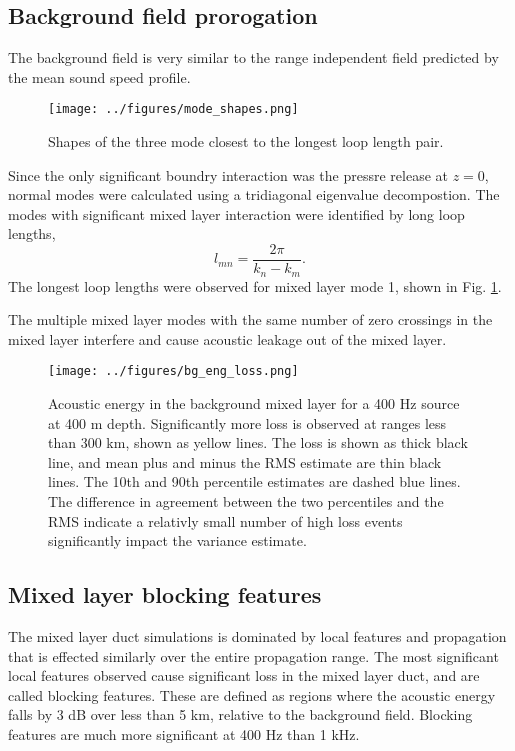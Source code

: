 \documentclass[preprint,NumberedRefs]{JASA}
\begin{document}
\subsection{Background field prorogation}
The background field is very similar to the range independent field predicted by the mean sound speed profile.
\begin{figure}
\texttt{[image: ../figures/mode\_shapes.png]}
    \caption{\label{fig:bg_modes}{Shapes of the three mode closest to the longest loop length pair.}}
\end{figure}

Since the only significant boundry interaction was the pressre release at $z=0$, normal modes were calculated using a tridiagonal eigenvalue decompostion. The modes with significant mixed layer interaction were identified by long loop lengths,
\begin{equation}
    l_{mn} = \frac{2 \pi}{k_n - k_m}.
    \label{eq:loop_length}
\end{equation}
The longest loop lengths were observed for mixed layer mode 1, shown in Fig. \ref{fig:bg_modes}.

The multiple mixed layer modes with the same number of zero crossings in the mixed layer interfere and cause acoustic leakage out of the mixed layer.
\begin{figure}
\texttt{[image: ../figures/bg\_eng\_loss.png]}
    \caption{Acoustic energy in the background mixed layer for a 400 Hz source at 400 m depth. Significantly more loss is observed at ranges less than 300 km, shown as yellow lines. The loss is shown as thick black line, and mean plus and minus the RMS estimate are thin black lines. The 10th and 90th percentile estimates are dashed blue lines. The difference in agreement between the two percentiles and the RMS indicate a relativly small number of high loss events significantly impact the variance estimate.}
    \label{fig:bg_eng}
\end{figure}





\subsection{Mixed layer blocking features}
The mixed layer duct simulations is dominated by local features and propagation that is effected similarly over the entire propagation range. The most significant local features observed cause significant loss in the mixed layer duct, and are called blocking features. These are defined as regions where the acoustic energy falls by 3 dB over less than 5 km, relative to the background field. Blocking features are much more significant at 400 Hz than 1 kHz.
\end{document}

